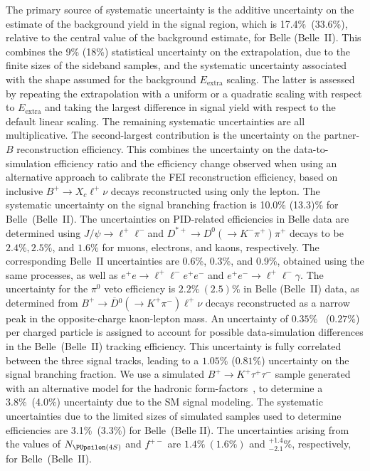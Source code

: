 The primary source of systematic uncertainty is the additive uncertainty on the estimate of the background yield in the signal region, which is 17.4\%~(33.6\%), relative to the central value of the background estimate, for Belle (Belle~II).  This combines the 9\% (18\%) statistical uncertainty on the extrapolation, due to the finite sizes of the sideband samples, and the systematic uncertainty associated with the shape assumed for the background $E_{\text {extra}}$ scaling. The latter is assessed by repeating the extrapolation with a uniform or a quadratic scaling with respect to $E_{\text {extra}}$ and taking the largest difference in signal yield with respect to the default linear scaling. The remaining systematic uncertainties are all multiplicative. The second-largest contribution is the uncertainty on the partner-$B$ reconstruction efficiency. This combines the uncertainty on the data-to-simulation efficiency ratio and the efficiency change observed when using an alternative approach to calibrate the FEI reconstruction efficiency, based on inclusive $B^+ \to X_c \ell^+ \nu$ decays reconstructed using only the lepton. The systematic uncertainty on the signal branching fraction is 10.0\% (13.3)\% for Belle~(Belle~II). The uncertainties on PID-related efficiencies in Belle data are determined using $J / \psi \rightarrow \ell^{+} \ell^{-}$and $D^{*+} \rightarrow D^0\left(\rightarrow K^{-} \pi^{+}\right) \pi^{+}$ decays to be $2.4\%, 2.5\%$, and $1.6\%$ for muons, electrons, and kaons, respectively. The corresponding Belle~II uncertainties are 0.6\%, 0.3\%, and 0.9\%, obtained using the same processes, as well as $e^+e \to \ell^+ \ell^- e^+e^-$ and $e^+e^- \to \ell^+ \ell^-\gamma$. The uncertainty for the $\pi^0$ veto efficiency is $2.2\%~(2.5)\%$ in Belle (Belle~II) data, as determined from $B^+ \to \overline{D}{}^{0}(\to K^+\pi^-)\ell^+\nu$ decays reconstructed as a narrow peak in the opposite-charge kaon-lepton mass. An uncertainty of $0.35 \%$~\cite{BaBar:2014omp:sec15} ($0.27 \%$) per charged particle is assigned to account for possible data-simulation differences in the Belle~(Belle~II) tracking efficiency. This uncertainty is fully correlated between the three signal tracks, leading to a $1.05 \%$ ($0.81 \%$) uncertainty on the signal branching fraction. We use a simulated $B^+ \rightarrow K^{+} \tau^{+} \tau^{-}$ sample generated with an alternative model for the hadronic form-factors~\cite{Parrott:2022zte}, to determine a 3.8\%~(4.0\%) uncertainty due to the SM signal modeling. The systematic uncertainties due to the limited sizes of simulated samples used to determine efficiencies are 3.1\%~(3.3\%) for Belle~(Belle II). The uncertainties arising from the values of $N_{\FourS}$ and $f^{+-}$ are $1.4\%~(1.6\%)$ and $ ^{+1.4}_{-2.1}\%$, respectively, for Belle~(Belle~II).





